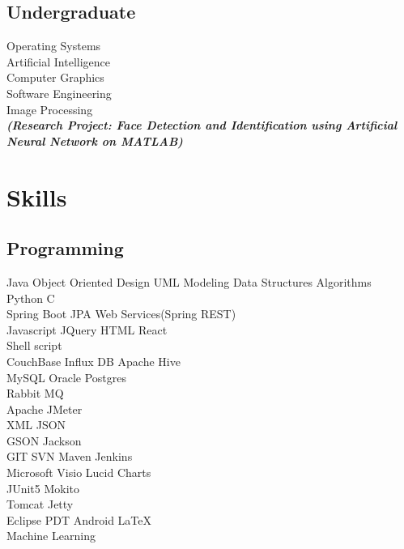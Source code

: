 \documentclass[]{kushal-resume}
\begin{document}
\begin{minipage}[t]{0.33\textwidth}
\subsection{Undergraduate}
Operating Systems \\
Artificial Intelligence  \\
Computer Graphics  \\
Software Engineering \\
Image Processing \\
{\footnotesize \textit{\textbf{(Research Project: Face Detection and Identification using Artificial Neural Network on MATLAB) }}} \\
\sectionsep


\section{Skills}
\subsection{Programming}
Java \textbullet{} Object Oriented Design  \textbullet{} UML Modeling \textbullet{} Data Structures \textbullet{} Algorithms \\

Python \textbullet{} C \\ 

Spring Boot \textbullet{} JPA \textbullet{} Web Services(Spring REST) \\
Javascript \textbullet{} JQuery \textbullet{} HTML \textbullet{} React \\
Shell script \\
CouchBase \textbullet{} Influx DB \textbullet{} Apache Hive \\
MySQL \textbullet{} Oracle \textbullet{} Postgres \\
Rabbit MQ \\
Apache JMeter \\
XML \textbullet{} JSON \\
GSON \textbullet{} Jackson \\
GIT \textbullet{} SVN \textbullet{} Maven \textbullet{} Jenkins \\
Microsoft Visio \textbullet{} Lucid Charts \\
JUnit5 \textbullet{} Mokito \\
Tomcat \textbullet{} Jetty \\
Eclipse PDT \textbullet{} Android \textbullet{} \LaTeX \\
Machine Learning \\
\sectionsep



%
%

\end{minipage} 
\end{document}
